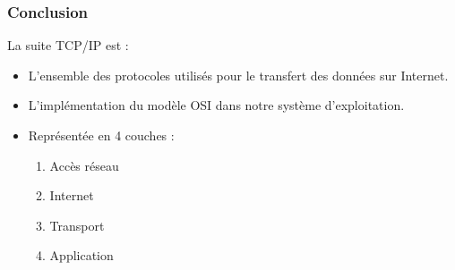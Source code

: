\documentclass{beamer}
\begin{document}
\begin{frame}
  \frametitle{Conclusion}

  La suite TCP/IP est :
  \begin{itemize}
      \item L'ensemble des protocoles utilisés pour le transfert des données sur Internet.
      \item L'implémentation du modèle OSI dans notre système d'exploitation.
      \item Représentée en 4 couches :
      \begin{enumerate}
          \item Accès réseau
          \item Internet
          \item Transport
          \item Application
      \end{enumerate}
  \end{itemize}
  
\end{frame}
\end{document}
